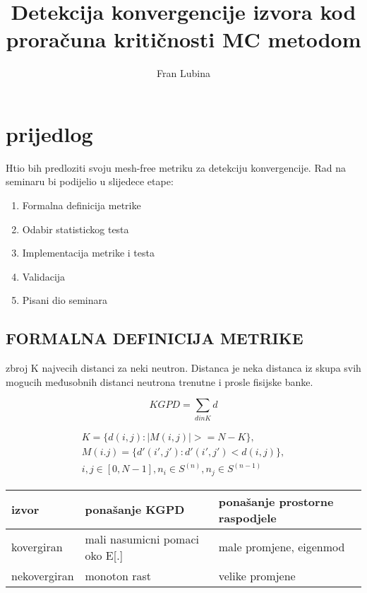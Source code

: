 \documentclass{report}
\title{Detekcija konvergencije izvora kod proračuna kritičnosti MC metodom}
\author{Fran Lubina}
\begin{document}
\maketitle

\chapter*{prijedlog}
Htio bih predloziti svoju mesh-free metriku za detekciju konvergencije.
Rad na seminaru bi podijelio u slijedece etape:
\begin{enumerate}[label=\arabic*)]
	\item Formalna definicija metrike
	\item Odabir statistickog testa
	\item Implementacija metrike i testa
	\item Validacija
	\item Pisani dio seminara
\end{enumerate}


\section{FORMALNA DEFINICIJA METRIKE}
zbroj K najvecih distanci za neki neutron.
Distanca je neka distanca iz skupa svih mogucih međusobnih distanci neutrona trenutne i prosle fisijske banke.

\begin{equation}
KGPD = \sum_{d in K} d
\end{equation}

\begin{equation}
\begin{split}
K = \{d(i, j) : |M(i, j)| >= N - K\}, \\
M(i. j) = \{d'(i', j') : d'(i', j') < d(i, j)\}, \\
i,j \in [0, N-1], n_i \in  S^{(n)}, n_j \in S^{(n-1)}
\end{split}
\end{equation}

\begin{longtable}{|p{90pt}|p{160pt}|p{160pt}|}
	\hline
	\textbf{izvor} & \textbf{ponašanje KGPD} & \textbf{ponašanje prostorne raspodjele} \\
	\hline
	\endhead %
	kovergiran & mali nasumicni pomaci oko E[.] & male promjene, eigenmod\\ \hline
	nekovergiran & monoton rast & velike promjene\\ \hline
\end{longtable}
\end{document}
